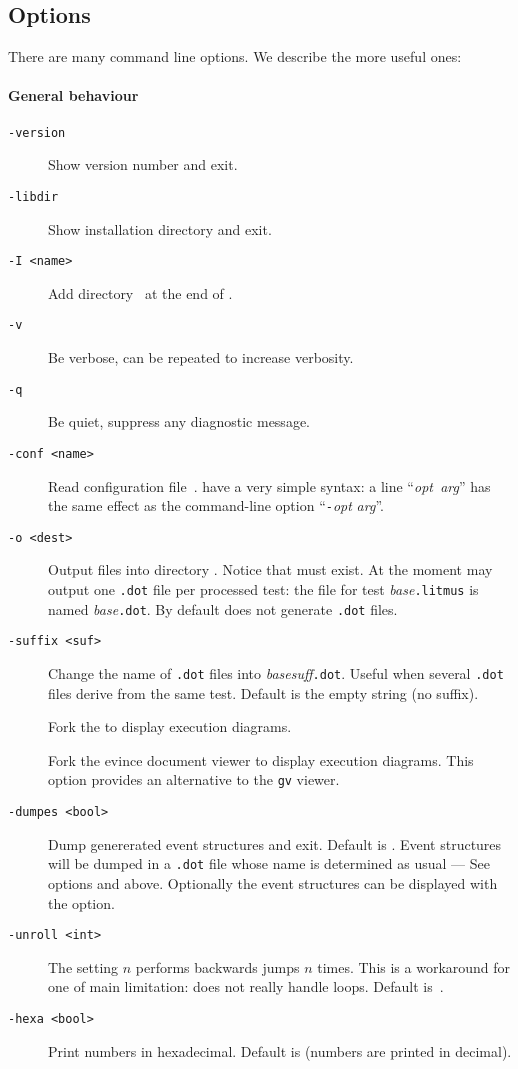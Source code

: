 \subsection{Options}
There are many command line options.
We describe the more useful ones:

\paragraph*{General behaviour}
\begin{description}
\item[{\tt -version}] Show version number and exit.
\item[{\tt -libdir}] Show installation directory and exit.
\item[{\tt -I <name>}] Add directory~ at the end of
 .
\item[{\tt -v}] Be verbose, can be repeated to increase verbosity.
\item[{\tt -q}] Be quiet, suppress any diagnostic message.
\item[{\tt -conf <name>}] Read configuration file~.
 have a very simple syntax:
a line ``\textit{opt}\texttt{  }\textit{arg}'' has the same effect as
the command-line option ``\texttt{-}\textit{opt} \textit{arg}''.
\item[{\tt -o <dest>}] Output files into directory .
Notice that  must exist.
At the moment \herd{} may output one \texttt{.dot} file per processed test:
the file for test \textit{base}\texttt{.litmus}
is named  \textit{base}\texttt{.dot}.
By default \herd{} does not generate \texttt{.dot} files.
\item[{\tt -suffix <suf>}] Change the name of \texttt{.dot} files
into \textit{base}\textit{suff}\texttt{.dot}. Useful when several \texttt{.dot} files derive from the same test. Default is the empty string (no suffix).
\item[{\tt {}}] Fork the  to display execution diagrams.
\item[{\tt {}}] Fork the evince document viewer to display execution diagrams. This option provides an alternative to the
{\tt gv} viewer.
\item[{\tt -dumpes <bool>}]
Dump genererated event structures and exit. Default is .
Event structures will be dumped in a \texttt{.dot} file whose
name is determined as usual --- See options  and  above.
Optionally the event structures can be displayed with the  option.
\item[{\tt -unroll <int>}] The setting $n$ performs backwards
jumps $n$ times. This is a workaround for one of \herd{} main limitation:
\herd{} does not really handle loops. Default is~.
\item[{\tt -hexa <bool>}] Print numbers in hexadecimal. Default is 
(numbers are printed in decimal).
\end{description}

